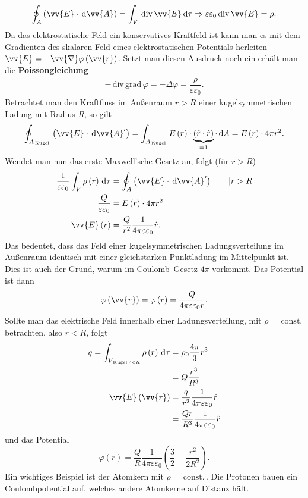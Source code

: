 \begin{align*}
        \oint_{A}^{}\left(\vv{E}\cdot \td\vv{A}\right)=\int_{V}^{}\,\text{div}\,\vv{E}\td \tau \Rightarrow  \varepsilon \varepsilon _0\,\text{div}\,\vv{E}=\rho 
.\end{align*}
Da das elektrostatische Feld ein konservatives Kraftfeld ist kann man es mit dem Gradienten des skalaren Feld eines elektrostatischen Potentials herleiten $\vv{E}=-\vv{\nabla }\varphi \left(\vv{r}\right)$. Setzt man diesen Ausdruck noch ein erhält man die \textbf{Poissongleichung}
\begin{align*}
        -\,\text{div}\,\text{grad}\,\varphi =-\Delta \varphi =\dfrac{\rho }{\varepsilon \varepsilon _0}
.\end{align*}
Betrachtet man den Kraftfluss im Außenraum $r>R$ einer kugelsymmetrischen Ladung mit Radius $R$, so gilt
\[ 
        \oint_{A_{\,\text{Kugel}\,}}^{}\left(\vv{E}\cdot \td \vv{A}'\right)=\int_{A_{\,\text{Kugel}\,}}^{}E\left(r\right)\cdot \underbrace{\left(\hat{r}\cdot \hat{r}\right)}_{=1}\cdot \td A=E\left(r\right)\cdot 4\pi r^2
.\] 
Wendet man nun das erste Maxwell'sche Gesetz an, folgt (für $r>R$)
\begin{align*}
        \dfrac{1}{\varepsilon \varepsilon _0}\int_{V}^{}\rho \left(r\right)\td \tau &=\oint_{A}^{}\left(\vv{E}\cdot \td \vv{A}'\right)\qquad |r>R\\
        \dfrac{Q}{\varepsilon \varepsilon _0}&=E\left(r\right)\cdot 4\pi r^2\\
        \vv{E}\left(r\right)&=\dfrac{Q}{r^2}\dfrac{1}{4\pi \varepsilon \varepsilon _0}\hat{r}
.\end{align*}
Das bedeutet, dass das Feld einer kugelsymmetrischen Ladungsverteilung im Außenraum identisch mit einer gleichstarken Punktladung im Mittelpunkt ist. Dies ist auch der Grund, warum im Coulomb--Gesetz $4\pi $ vorkommt. Das Potential ist dann
\[ 
        \varphi \left(\vv{r}\right)=\varphi \left(r\right)=\dfrac{Q}{4\pi \varepsilon \varepsilon _0r}
.\] 
Sollte man das elektrische Feld innerhalb einer Ladungsverteilung, mit $\rho =\,\text{const.}\,$ betrachten, also $r<R$, folgt
\begin{align*}
        q=\int_{V_{\,\text{Kugel}\,r<R}}^{}\rho \left(r\right)\td \tau &=\rho _0\dfrac{4\pi }{3}r^3\\
                                                                       &=Q\dfrac{r^3}{R^3}\\
        \vv{E}\left(\vv{r}\right)&=\dfrac{q}{r^2}\dfrac{1}{4\pi \varepsilon \varepsilon _0}\hat{r}\\
                                 &=\dfrac{Qr}{R^3}\dfrac{1}{4\pi \varepsilon \varepsilon _0}\hat{r}
\end{align*}
und das Potential
\[ 
        \varphi \left(r\right)=\dfrac{Q}{R}\dfrac{1}{4\pi \varepsilon \varepsilon _0}\left(\dfrac{3}{2}-\dfrac{r^2}{2R^2}\right)
.\] 
Ein wichtiges Beispiel ist der Atomkern mit $\rho =\,\text{const.}\,$. Die Protonen bauen ein Coulombpotential auf, welches andere Atomkerne auf Distanz hält.

